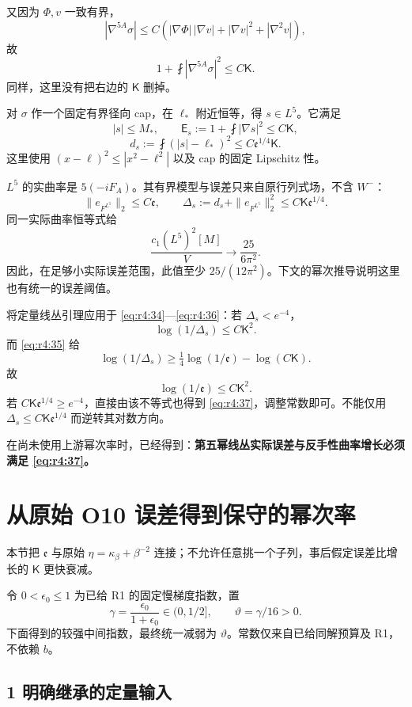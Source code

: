 \documentclass[UTF8,11pt,fontset=none]{ctexart}
\begin{document}
又因为 \(\Phi,v\) 一致有界， \[
|\nabla^{5A}\sigma|
\le C\left(|\nabla\Phi|\,|\nabla v|
+|\nabla v|^2+|\nabla^2v|\right),
\] 故 \[
\boxed{1+\fint|\nabla^{5A}\sigma|^2\le C\mathsf K.}
\tag{4.33}\label{eq:r4:33}
\] 同样，这里没有把右边的 \(\mathsf K\) 删掉。

对 \(\sigma\) 作一个固定有界径向 cap，在 \(\ell_*\) 附近恒等，得 \(s\in L^5\)。它满足 \[
|s|\le M_*,\qquad
\mathsf E_s:=1+\fint|\nabla s|^2\le C\mathsf K,
\] \[
d_s:=\fint(|s|-\ell_*)^2
\le C\mathfrak e^{1/4}\mathsf K.
\tag{4.34}\label{eq:r4:34}
\] 这里使用 \((x-\ell)^2\le|x^2-\ell^2|\) 以及 cap 的固定 Lipschitz 性。

\(L^5\) 的实曲率是 \(5(-iF_A)\)。其有界模型与误差只来自原行列式场，不含 \(W^-\)： \[
\|e_{F^{L^5}}\|_2\le C\mathfrak e,
\qquad
\Delta_s:=d_s+\|e_{F^{L^5}}\|_2^2
\le C\mathsf K\mathfrak e^{1/4}.
\tag{4.35}\label{eq:r4:35}
\] 同一实际曲率恒等式给 \[
\frac{c_1(L^5)^2[M]}V\longrightarrow\frac{25}{6\pi^2}.
\tag{4.36}\label{eq:r4:36}
\] 因此，在足够小实际误差范围，此值至少 \(25/(12\pi^2)\)。下文的幂次推导说明这里也有统一的误差阈值。

将定量线丛引理应用于 \eqref{eq:r4:34}---\eqref{eq:r4:36}：若 \(\Delta_s<e^{-4}\)， \[
\log(1/\Delta_s)\le C\mathsf K^2.
\] 而 \eqref{eq:r4:35} 给 \[
\log(1/\Delta_s)\ge\tfrac14\log(1/\mathfrak e)-\log(C\mathsf K).
\] 故 \[
\boxed{\log(1/\mathfrak e)\le C\mathsf K^2.}
\tag{4.37}\label{eq:r4:37}
\] 若 \(C\mathsf K\mathfrak e^{1/4}\ge e^{-4}\)，直接由该不等式也得到 \eqref{eq:r4:37}，调整常数即可。不能仅用 \(\Delta_s\le C\mathsf K\mathfrak e^{1/4}\) 而逆转其对数方向。

在尚未使用上游幂次率时，已经得到：\textbf{第五幂线丛实际误差与反手性曲率增长必须满足 \eqref{eq:r4:37}。}

\section{从原始 O10 误差得到保守的幂次率}\label{ch4:ux4eceux539fux59cb-o10-ux8befux5deeux5f97ux5230ux4fddux5b88ux7684ux5e42ux6b21ux7387}

本节把 \(\mathfrak e\) 与原始 \(\eta=\kappa_\beta+\beta^{-2}\) 连接；不允许任意挑一个子列，事后假定误差比增长的 \(\mathsf K\) 更快衰减。

令 \(0<\epsilon_0\le1\) 为已给 R1 的固定慢梯度指数，置 \[
\gamma=\frac{\epsilon_0}{1+\epsilon_0}\in(0,1/2],
\qquad \vartheta=\gamma/16>0.
\] 下面得到的较强中间指数，最终统一减弱为 \(\vartheta\)。常数仅来自已给同解预算及 R1，不依赖 \(b\)。

\subsection{1 明确继承的定量输入}\label{ch4:ux660eux786eux7ee7ux627fux7684ux5b9aux91cfux8f93ux5165}
\end{document}
